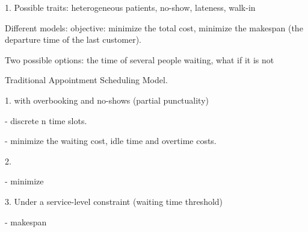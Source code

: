\documentclass{article}
\begin{document}



1. Possible traits: heterogeneous patients, no-show, lateness, walk-in

Different models: objective: minimize the total cost, minimize the makespan (the departure time of the last customer).

Two possible options: the time of several people waiting, what if it is not 

Traditional Appointment Scheduling Model.

1. with overbooking and no-shows (partial punctuality)

- discrete n time slots.

- minimize the waiting cost, idle time and overtime costs.


2. 

- minimize 


3. Under a service-level constraint (waiting time threshold)

- makespan
\end{document}
